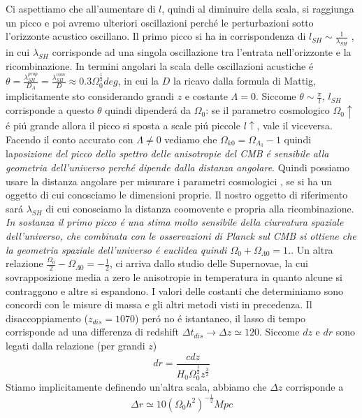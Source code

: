 \documentclass[12pt, a4paper]{article}
\begin{document}
Ci aspettiamo che all'aumentare di $l$, quindi al diminuire della scala, si raggiunga un picco e poi avremo ulteriori oscillazioni perch\'{e} le perturbazioni sotto l'orizzonte acustico oscillano. Il primo picco si ha in corrispondenza di $l_{SH}\sim \frac{1}{\lambda_{SH}}$ , in cui $\lambda_{SH}$ corrisponde ad una singola oscillazione tra l'entrata nell'orizzonte e la ricombinazione. In termini angolari la scala delle oscillazioni acustiche \'{e} $\theta=\frac{\lambda_{SH}^{prop}}{D_{A}}=\frac{\lambda_{SH}^{com}}{D}\approx 0.3 \Omega_0^{\frac{1}{2}}deg$, in cui la $D$ la ricavo dalla formula di Mattig, implicitamente sto considerando grandi $z$ e costante $\Lambda=0$. Siccome $\theta \sim \frac{\pi}{l}$, $l_{SH}$ corrisponde a questo $\theta$ quindi dipender\'{a} da $\Omega_0$: se il parametro cosmologico $\Omega_0 \uparrow$ \'{e} pi\'{u} grande allora il picco si sposta a scale pi\'{u} piccole $l\uparrow$, vale il viceversa. Facendo il conto accurato con $\Lambda \neq 0$  vediamo che  $\Omega_{k0}=\Omega_{\Lambda_0}-1$ quindi la\textit{posizione del picco dello spettro delle anisotropie del CMB \'{e} sensibile alla geometria dell'universo perch\'{e} dipende dalla distanza angolare}. Quindi possiamo usare la distanza angolare per misurare i parametri cosmologici , se si ha un oggetto di cui conosciamo le dimensioni proprie. Il nostro oggetto di riferimento sar\'{a} $\lambda_{SH}$ di cui conosciamo la distanza coomovente e propria alla ricombinazione. \textit{In sostanza il primo picco \'{e} una stima molto sensibile della ciurvatura spaziale dell'universo, che combinata con le osservazioni di Planck sul CMB si ottiene che la geometria spaziale dell'universo \'{e} euclidea quindi $\Omega_0+\Omega_{\Lambda0}=1$.}. Un altra relazione $\frac{\Omega_0}{2}-\Omega_{\Lambda0}=-\frac{1}{2}$, ci arriva dallo studio delle Supernovae, la cui sovrapposizione media a zero le anisotropie in temperatura in quanto alcune si contraggono e altre si espandono. I valori delle costanti che determiniamo sono concordi con le misure di massa e gli altri metodi visti in precedenza. Il disaccoppiamento ($z_{dis}=1070$) per\'{o} no \'{e} istantaneo, il lasso di tempo corrisponde ad una differenza di redshift $\Delta t_{dis}\rightarrow \Delta z \simeq 120$. Siccome $dz$ e $dr$ sono legati dalla relazione (per grandi $z$)
\begin{equation}
dr= \frac{cdz}{H_0 \Omega_0^{\frac{1}{2}}z^{\frac{3}{2}}}
\end{equation}
Stiamo implicitamente definendo un'altra scala, abbiamo che $\Delta z$ corrisponde a
\begin{equation}
\Delta r\simeq 10(\Omega_0 h^2)^{-\frac{1}{2}} Mpc
\end{equation}
\end{document}
